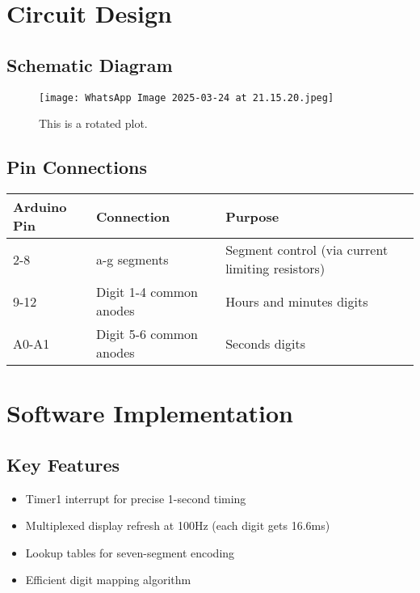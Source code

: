 \documentclass{article}
\begin{document}
\section{Circuit Design}

\subsection{Schematic Diagram}
\begin{figure}[H]
    \centering
    \texttt{[image: WhatsApp Image 2025-03-24 at 21.15.20.jpeg]} %
    \caption{This is a rotated plot.}
    \label{fig:rotatedplot}
\end{figure}
\subsection{Pin Connections}
\begin{tabularx}{\linewidth}{|l|l|X|}
\hline
\textbf{Arduino Pin} & \textbf{Connection} & \textbf{Purpose} \\ \hline
2-8 & a-g segments & Segment control (via current limiting resistors) \\ \hline
9-12 & Digit 1-4 common anodes & Hours and minutes digits \\ \hline
A0-A1 & Digit 5-6 common anodes & Seconds digits \\ \hline
\end{tabularx}

\section{Software Implementation}

\subsection{Key Features}
\begin{itemize}
\item Timer1 interrupt for precise 1-second timing
\item Multiplexed display refresh at 100Hz (each digit gets 16.6ms)
\item Lookup tables for seven-segment encoding
\item Efficient digit mapping algorithm
\end{itemize}
\end{document}
